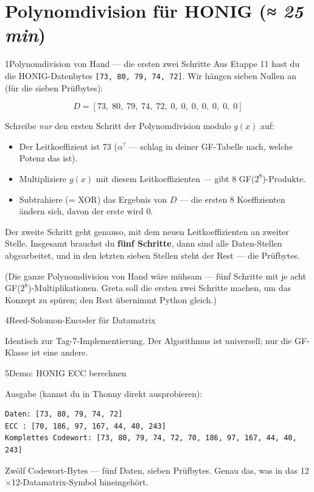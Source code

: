 \section{Polynomdivision für HONIG \normalfont(\textit{≈ 25 min})}

\begin{bleistiftuebung}{1}{Polynomdivision von Hand — die ersten zwei Schritte}
Aus Etappe 11 hast du die HONIG-Datenbytes \texttt{[73, 80, 79, 74,
72]}. Wir hängen sieben Nullen an (für die sieben Prüfbytes):

\[
  D = [73,\; 80,\; 79,\; 74,\; 72,\; 0,\; 0,\; 0,\; 0,\; 0,\; 0,\; 0]
\]

Schreibe \emph{nur} den ersten Schritt der Polynomdivision modulo
$g(x)$ auf:

\begin{itemize}
\item Der Leitkoeffizient ist 73 ($\alpha^?$ — schlag in deiner
  GF-Tabelle nach, welche Potenz das ist).
\item Multipliziere $g(x)$ mit diesem Leitkoeffizienten — gibt 8
  GF($2^8$)-Produkte.
\item Subtrahiere (= XOR) das Ergebnis von $D$ — die ersten 8
  Koeffizienten ändern sich, davon der erste wird $0$.
\end{itemize}

Der zweite Schritt geht genauso, mit dem neuen Leitkoeffizienten an
zweiter Stelle. Insgesamt brauchst du \textbf{fünf Schritte}, dann
sind alle Daten-Stellen abgearbeitet, und in den letzten sieben
Stellen steht der Rest — die Prüfbytes.

(Die ganze Polynomdivision von Hand wäre mühsam — fünf Schritte
mit je acht GF($2^8$)-Multiplikationen. Greta soll die ersten zwei
Schritte machen, um das Konzept zu spüren; den Rest übernimmt Python
gleich.)
\end{bleistiftuebung}

\begin{pythoneinheit}{4}{Reed-Solomon-Encoder für Datamatrix}

Identisch zur Tag-7-Implementierung. Der Algorithmus ist universell;
nur die GF-Klasse ist eine andere.
\end{pythoneinheit}

\begin{pythoneinheit}{5}{Demo: HONIG ECC berechnen}

Ausgabe (kannst du in Thonny direkt ausprobieren):

\begin{verbatim}
Daten: [73, 80, 79, 74, 72]
ECC : [70, 186, 97, 167, 44, 40, 243]
Komplettes Codewort: [73, 80, 79, 74, 72, 70, 186, 97, 167, 44, 40, 243]
\end{verbatim}

Zwölf Codewort-Bytes — fünf Daten, sieben Prüfbytes. Genau das, was
in das 12$\times$12-Datamatrix-Symbol hineingehört.
\end{pythoneinheit}

